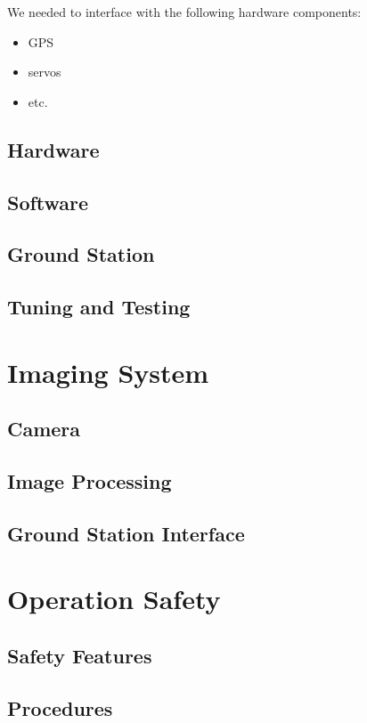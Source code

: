 \documentclass[10pt]{report}
\begin{document}
We needed to interface with the following hardware components:
\begin{itemize}
	\item GPS
	\item servos
	\item etc.
\end{itemize}

\subsection{Hardware}

\subsection{Software}

\subsection{Ground Station}

\subsection{Tuning and Testing}

\section{Imaging System}

\subsection{Camera}

\subsection{Image Processing}

\subsection{Ground Station Interface}

\section{Operation Safety}

\subsection{Safety Features}

\subsection{Procedures}



\end{document}
